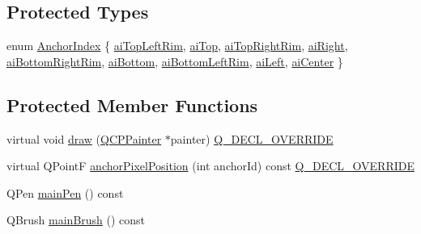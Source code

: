 \subsection*{Protected Types}
\begin{DoxyCompactItemize}
\item 
enum \mbox{\hyperlink{class_q_c_p_item_ellipse_a415009889543169f35b70795f415e45e}{Anchor\+Index}} \{ \newline
\mbox{\hyperlink{class_q_c_p_item_ellipse_a415009889543169f35b70795f415e45eab2538849b88921e7fc1dcc15b2a6109d}{ai\+Top\+Left\+Rim}}, 
\mbox{\hyperlink{class_q_c_p_item_ellipse_a415009889543169f35b70795f415e45ea83e55b0c1799baac1eecab52bcbe096d}{ai\+Top}}, 
\mbox{\hyperlink{class_q_c_p_item_ellipse_a415009889543169f35b70795f415e45ea415d82233c14f0c70c245d50e706e75b}{ai\+Top\+Right\+Rim}}, 
\mbox{\hyperlink{class_q_c_p_item_ellipse_a415009889543169f35b70795f415e45ea0f0dcfdf87d9405b53b2129740fb6ba6}{ai\+Right}}, 
\newline
\mbox{\hyperlink{class_q_c_p_item_ellipse_a415009889543169f35b70795f415e45eab62732e96d67801d50c6a9bdebc374d0}{ai\+Bottom\+Right\+Rim}}, 
\mbox{\hyperlink{class_q_c_p_item_ellipse_a415009889543169f35b70795f415e45ea5894287dedaeec1f48394fd950ccff5b}{ai\+Bottom}}, 
\mbox{\hyperlink{class_q_c_p_item_ellipse_a415009889543169f35b70795f415e45ea7b8101bfc590af8ce32961f6545c4f90}{ai\+Bottom\+Left\+Rim}}, 
\mbox{\hyperlink{class_q_c_p_item_ellipse_a415009889543169f35b70795f415e45eae74dad00419a0e1f42877510158fb922}{ai\+Left}}, 
\newline
\mbox{\hyperlink{class_q_c_p_item_ellipse_a415009889543169f35b70795f415e45ea580ec0e9b9fd1488fccf5783e52c0c02}{ai\+Center}}
 \}
\end{DoxyCompactItemize}
\subsection*{Protected Member Functions}
\begin{DoxyCompactItemize}
\item 
virtual void \mbox{\hyperlink{class_q_c_p_item_ellipse_a77eebd67a402fc496082a2e51356928c}{draw}} (\mbox{\hyperlink{class_q_c_p_painter}{Q\+C\+P\+Painter}} $\ast$painter) \mbox{\hyperlink{qcustomplot_8h_a42cc5eaeb25b85f8b52d2a4b94c56f55}{Q\+\_\+\+D\+E\+C\+L\+\_\+\+O\+V\+E\+R\+R\+I\+DE}}
\item 
virtual Q\+PointF \mbox{\hyperlink{class_q_c_p_item_ellipse_a35cd6983c61a16ac33c23f08dd2817cc}{anchor\+Pixel\+Position}} (int anchor\+Id) const \mbox{\hyperlink{qcustomplot_8h_a42cc5eaeb25b85f8b52d2a4b94c56f55}{Q\+\_\+\+D\+E\+C\+L\+\_\+\+O\+V\+E\+R\+R\+I\+DE}}
\item 
Q\+Pen \mbox{\hyperlink{class_q_c_p_item_ellipse_a9c11717026dfd685c83a9650666b7181}{main\+Pen}} () const
\item 
Q\+Brush \mbox{\hyperlink{class_q_c_p_item_ellipse_a6218bdf5e703f609b934b0bf9c8d0971}{main\+Brush}} () const
\end{DoxyCompactItemize}
